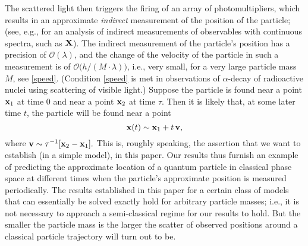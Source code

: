 \documentclass[11pt]{article}
\begin{document}
The scattered light then triggers the firing of an array of photomultipliers, which results in an approximate \textit{indirect} measurement of the position of the particle; (see, e.g., \cite{BCFFS} for an analysis of indirect measurements of observables with continuous spectra, such as ${\bf{X}}$). The indirect measurement of the 
particle's position has a precision of $\mathcal{O}(\lambda)$, and the change of the velocity of the particle in such a 
measurement is of $\mathcal{O} \big(h/(M \cdot \lambda)\big)$, i.e., very small, for a very large particle mass $M$, 
see \eqref{speed}. (Condition \eqref{speed} is met in observations of $\alpha$-decay of radioactive nuclei using scattering of visible light.) Suppose the particle is found near a point ${\bf{x}}_1$ at time $0$ and near a point ${\bf{x}}_2$ 
at time $\tau$. Then it is likely that, at some later time $t$, the particle will be found near a point 
$${\bf{x}}(t) \sim {\bf{x}}_1+ t\, {\bf{v}},$$ 
where ${\bf{v}}\sim \tau^{-1} [{\bf{x}}_2 - {\bf{x}}_1].$ This is, roughly speaking, the assertion that we want to establish (in a simple model), in this paper. Our results thus furnish an example of predicting the approximate location of a 
quantum particle in classical phase space at different times when the particle's approximate position 
is measured periodically. The results established in this paper for a certain class of models that can essentially be solved exactly hold for arbitrary particle masses; i.e., it is not necessary to approach a semi-classical regime for our results to hold. But the smaller the particle mass is the larger the scatter of observed positions around a classical particle trajectory will turn out to be.
 
\end{document}
